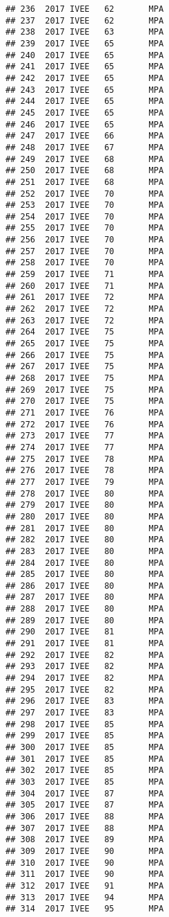 \documentclass[]{article}
\begin{document}
\begin{verbatim}
## 236  2017 IVEE   62       MPA
## 237  2017 IVEE   62       MPA
## 238  2017 IVEE   63       MPA
## 239  2017 IVEE   65       MPA
## 240  2017 IVEE   65       MPA
## 241  2017 IVEE   65       MPA
## 242  2017 IVEE   65       MPA
## 243  2017 IVEE   65       MPA
## 244  2017 IVEE   65       MPA
## 245  2017 IVEE   65       MPA
## 246  2017 IVEE   65       MPA
## 247  2017 IVEE   66       MPA
## 248  2017 IVEE   67       MPA
## 249  2017 IVEE   68       MPA
## 250  2017 IVEE   68       MPA
## 251  2017 IVEE   68       MPA
## 252  2017 IVEE   70       MPA
## 253  2017 IVEE   70       MPA
## 254  2017 IVEE   70       MPA
## 255  2017 IVEE   70       MPA
## 256  2017 IVEE   70       MPA
## 257  2017 IVEE   70       MPA
## 258  2017 IVEE   70       MPA
## 259  2017 IVEE   71       MPA
## 260  2017 IVEE   71       MPA
## 261  2017 IVEE   72       MPA
## 262  2017 IVEE   72       MPA
## 263  2017 IVEE   72       MPA
## 264  2017 IVEE   75       MPA
## 265  2017 IVEE   75       MPA
## 266  2017 IVEE   75       MPA
## 267  2017 IVEE   75       MPA
## 268  2017 IVEE   75       MPA
## 269  2017 IVEE   75       MPA
## 270  2017 IVEE   75       MPA
## 271  2017 IVEE   76       MPA
## 272  2017 IVEE   76       MPA
## 273  2017 IVEE   77       MPA
## 274  2017 IVEE   77       MPA
## 275  2017 IVEE   78       MPA
## 276  2017 IVEE   78       MPA
## 277  2017 IVEE   79       MPA
## 278  2017 IVEE   80       MPA
## 279  2017 IVEE   80       MPA
## 280  2017 IVEE   80       MPA
## 281  2017 IVEE   80       MPA
## 282  2017 IVEE   80       MPA
## 283  2017 IVEE   80       MPA
## 284  2017 IVEE   80       MPA
## 285  2017 IVEE   80       MPA
## 286  2017 IVEE   80       MPA
## 287  2017 IVEE   80       MPA
## 288  2017 IVEE   80       MPA
## 289  2017 IVEE   80       MPA
## 290  2017 IVEE   81       MPA
## 291  2017 IVEE   81       MPA
## 292  2017 IVEE   82       MPA
## 293  2017 IVEE   82       MPA
## 294  2017 IVEE   82       MPA
## 295  2017 IVEE   82       MPA
## 296  2017 IVEE   83       MPA
## 297  2017 IVEE   83       MPA
## 298  2017 IVEE   85       MPA
## 299  2017 IVEE   85       MPA
## 300  2017 IVEE   85       MPA
## 301  2017 IVEE   85       MPA
## 302  2017 IVEE   85       MPA
## 303  2017 IVEE   85       MPA
## 304  2017 IVEE   87       MPA
## 305  2017 IVEE   87       MPA
## 306  2017 IVEE   88       MPA
## 307  2017 IVEE   88       MPA
## 308  2017 IVEE   89       MPA
## 309  2017 IVEE   90       MPA
## 310  2017 IVEE   90       MPA
## 311  2017 IVEE   90       MPA
## 312  2017 IVEE   91       MPA
## 313  2017 IVEE   94       MPA
## 314  2017 IVEE   95       MPA

\end{verbatim}
\end{document}

